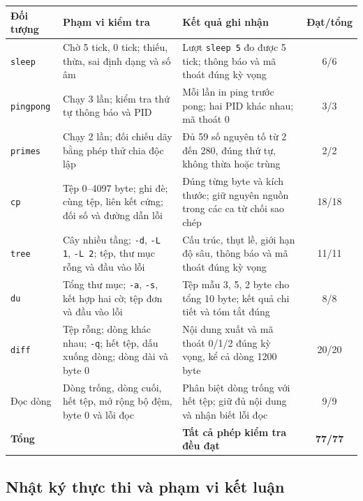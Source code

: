 \documentclass[12pt,a4paper]{article}
\begin{document}
\begin{center}
\small
\renewcommand{\arraystretch}{1.15}
\begin{tabularx}{\textwidth}{l >{\raggedright\arraybackslash}p{} >{\raggedright\arraybackslash}X c}
\toprule
\rowcolor{tableheader}
\textbf{Đối tượng} & \textbf{Phạm vi kiểm tra} & \textbf{Kết quả ghi nhận} & \textbf{Đạt/tổng} \\
\midrule
\texttt{sleep} & Chờ 5 tick, 0 tick; thiếu, thừa, sai định dạng và số âm & Lượt \texttt{sleep 5} đo được 5 tick; thông báo và mã thoát đúng kỳ vọng & 6/6 \\
\texttt{pingpong} & Chạy 3 lần; kiểm tra thứ tự thông báo và PID & Mỗi lần in ping trước pong; hai PID khác nhau; mã thoát 0 & 3/3 \\
\texttt{primes} & Chạy 2 lần; đối chiếu dãy bằng phép thử chia độc lập & Đủ 59 số nguyên tố từ 2 đến 280, đúng thứ tự, không thừa hoặc trùng & 2/2 \\
\texttt{cp} & Tệp 0--4097 byte; ghi đè; cùng tệp, liên kết cứng; đối số và đường dẫn lỗi & Đúng từng byte và kích thước; giữ nguyên nguồn trong các ca từ chối sao chép & 18/18 \\
\texttt{tree} & Cây nhiều tầng; \texttt{-d}, \texttt{-L 1}, \texttt{-L 2}; tệp, thư mục rỗng và đầu vào lỗi & Cấu trúc, thụt lề, giới hạn độ sâu, thông báo và mã thoát đúng kỳ vọng & 11/11 \\
\texttt{du} & Tổng thư mục; \texttt{-a}, \texttt{-s}, kết hợp hai cờ; tệp đơn và đầu vào lỗi & Tệp mẫu 3, 5, 2 byte cho tổng 10 byte; kết quả chi tiết và tóm tắt đúng & 8/8 \\
\texttt{diff} & Tệp rỗng; dòng khác nhau; \texttt{-q}; hết tệp, dấu xuống dòng; dòng dài và byte 0 & Nội dung xuất và mã thoát 0/1/2 đúng kỳ vọng, kể cả dòng 1200 byte & 20/20 \\
Đọc dòng & Dòng trống, dòng cuối, hết tệp, mở rộng bộ đệm, byte 0 và lỗi đọc & Phân biệt dòng trống với hết tệp; giữ đủ nội dung và nhận biết lỗi đọc & 9/9 \\
\midrule
\textbf{Tổng} & & \textbf{Tất cả phép kiểm tra đều đạt} & \textbf{77/77} \\
\bottomrule
\end{tabularx}
\end{center}

\subsection{Nhật ký thực thi và phạm vi kết luận}
\end{document}
